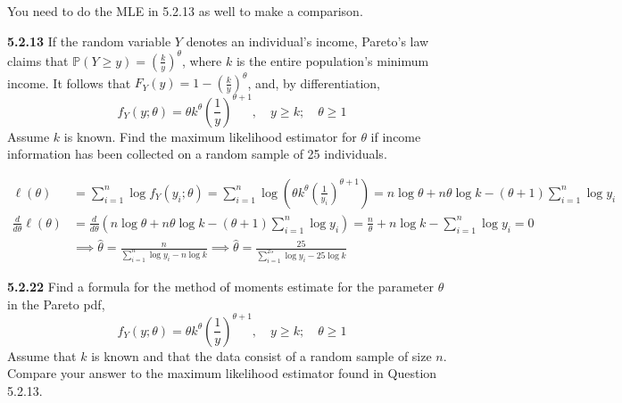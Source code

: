 \documentclass{article}
\renewcommand{\P}{\mathbb{P}}
\begin{document}
\begin{probset}
\newpage

\begin{prob}
    You need to do the MLE in 5.2.13 as well to make a comparison. 
    \begin{subprobset}
        \begin{subprob}
            \textbf{5.2.13} If the random variable $Y$ denotes an individual's income, Pareto's law claims that $\P(Y \geq y) = \left( \frac{k}{y} \right)^\theta$, where $k$ is the entire population's minimum income. It follows that $F_Y(y) = 1 - \left( \frac{k}{y} \right)^\theta$, and, by differentiation, 
            \[
                f_Y(y; \theta) = \theta k^\theta \left( \frac{1}{y} \right)^{\theta+1}, \quad y \geq k; \quad \theta \geq 1
            \]
            Assume $k$ is known. Find the maximum likelihood estimator for $\theta$ if income information has been collected on a random sample of 25 individuals.

            \begin{soln}
                \begin{align*}
                    \ell(\theta) &= \sum_{i=1}^n \log f_Y(y_i; \theta) = \sum_{i=1}^n \log \left( \theta k^\theta \left( \frac{1}{y_i} \right)^{\theta+1} \right) = n\log \theta + n\theta\log k - (\theta+1)\sum_{i=1}^n \log y_i \\
                    \frac{d}{d\theta} \ell(\theta) &= \frac{d}{d\theta} \left( n\log \theta + n\theta\log k - (\theta+1)\sum_{i=1}^n \log y_i \right) = \frac{n}{\theta} + n\log k - \sum_{i=1}^n \log y_i = 0 \\
                    &\implies \hat\theta = \frac{n}{\sum_{i=1}^n \log y_i - n\log k} \implies \hat\theta = \frac{25}{\sum_{i=1}^{25} \log y_i - 25\log k}
                \end{align*}
            \end{soln}
        \end{subprob}

        \begin{subprob}
            \textbf{5.2.22} Find a formula for the method of moments estimate for the parameter $\theta$ in the Pareto pdf,
            \[
                f_Y(y; \theta) = \theta k^{\theta} \left( \frac{1}{y} \right)^{\theta+1}, \quad y \geq k; \quad \theta \geq 1
            \]
            Assume that $k$ is known and that the data consist of a random sample of size $n$. Compare your answer to the maximum likelihood estimator found in Question 5.2.13.


\end{subprob}
\end{subprobset}
\end{prob}
\end{probset}
\end{document}
